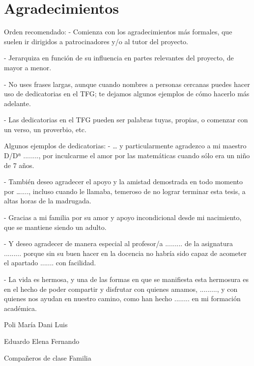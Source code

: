 \chapter*{Agradecimientos}
\pagestyle{empty}

\lettrine[lraise=-0.1, lines=2, loversize=0.25]{}{}


Orden recomendado:
- Comienza con los agradecimientos más formales, que suelen ir dirigidos a patrocinadores y/o al tutor del proyecto.

- Jerarquiza en función de su influencia en partes relevantes del proyecto, de mayor a menor.

- No uses frases largas, aunque cuando nombres a personas cercanas puedes hacer uso de dedicatorias en el TFG; te dejamos algunos ejemplos de cómo hacerlo más adelante.

- Las dedicatorias en el TFG pueden ser palabras tuyas, propias, o comenzar con un verso, un proverbio, etc.

Algunos ejemplos de dedicatorias:
- … y particularmente agradezco a mi maestro D/Dª ........, por inculcarme el amor por las matemáticas cuando sólo era un niño de 7 años.

- También deseo agradecer el apoyo y la amistad demostrada en todo momento por …...., incluso cuando le llamaba, temeroso de no lograr terminar esta tesis, a altas horas de la madrugada.

- Gracias a mi familia por su amor y apoyo incondicional desde mi nacimiento, que se mantiene siendo un adulto.

- Y deseo agradecer de manera especial al profesor/a ......... de la asignatura ......... porque sin su buen hacer en la docencia no habría sido capaz de acometer el apartado ....... con facilidad.

- La vida es hermosa, y una de las formas en que se manifiesta esta hermosura es en el hecho de poder compartir y disfrutar con quienes amamos, ........., y con quienes nos ayudan en nuestro camino, como han hecho ........ en mi formación académica.

Poli
María
Dani
Luis

Eduardo
Elena
Fernando

Compañeros de clase
Familia

